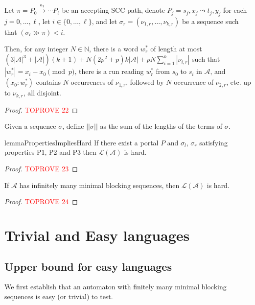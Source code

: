 \documentclass[letterpaper, USenglish, cleveref, autoref, thm-restate, numberwithinsect]{lipics-v2021}
\theoremstyle{theorem}
\theoremstyle{definition}
\newcommand{\Aa}{\mathcal{A}}
\newcommand{\curly}{\mathrel{\leadsto}}
\newcommand{\lang}[1]{\mathcal{L}(#1)}
\newcommand{\lefteffect}[2]{(#1 \gg #2)}
\newcommand{\NN}{\mathbb{N}}
\newcommand{\portal}[4]{#1,#2 \curly #3, #4}
\newcommand{\SCCpath}{\pi}
\newcommand{\set}[1]{\{ #1 \}}
\newcommand{\sigmasize}[1]{|| #1 ||}
\newcommand{\timedword}[2]{(#1:#2)}
\begin{document}
\begin{lemma}
	\label{lem:seq-right}
	Let $\SCCpath = P_0 \xrightarrow{a_1} \cdots  P_\ell$ be an accepting SCC-path,
	denote $P_j = \portal{s_j}{x_j}{t_j}{y_j}$ for each $j = 0,\ldots,\ell$,
	let $i \in \set{0, \ldots, \ell}$,
	and let $\sigma_r = (\nu_{1,r}, \ldots, \nu_{k,r})$ be a sequence such that $\lefteffect{\sigma_l}{\SCCpath} < i$.

	Then, for any integer $N \in \NN$, there is a word $w_r^*$ of length at most $(3|\Aa|^3+|\Aa|)(k+1)  + N(2p^2+p)k|\Aa| + pN\sum_{i=1}^k|\nu_{i,r}|$ such that $|w_r^*| = x_i-x_0 \pmod{p}$, there is a run reading $w_r^*$ from $s_0$ to $s_i$ in $\Aa$, and $\timedword{x_0}{w_r^*}$ contains $N$ occurrences of $\nu_{1,r}$, followed by $N$ occurrence of $\nu_{2,r}$, etc. up to $\nu_{k,r}$, all disjoint.
\end{lemma}
\begin{proof}\textcolor{red}{TOPROVE 22}\end{proof}


Given a sequence $\sigma$, define $\sigmasize{\sigma}$ as the sum of the lengths of the terms of $\sigma$.
\begin{restatable}{lemma}{PropertiesImpliesHard}
	\label{lem:P1-P3-then-hard}
	If there exist a portal $P$ and $\sigma_l$, $\sigma_r$ satisfying properties P1, P2 and P3 then $\lang{\Aa}$  is hard.
\end{restatable}
\begin{proof}\textcolor{red}{TOPROVE 23}\end{proof}

\begin{proposition}
		If $\Aa$ has infinitely many minimal blocking sequences, 
		then $\lang{\Aa}$ is hard.
\end{proposition}
\begin{proof}\textcolor{red}{TOPROVE 24}\end{proof} 
\section{Trivial and Easy languages}
\label{sec:trivial-easy}
\subsection{Upper bound for easy languages}

We first establish that an automaton with finitely many minimal blocking sequences is easy (or trivial) to test.
\end{document}
